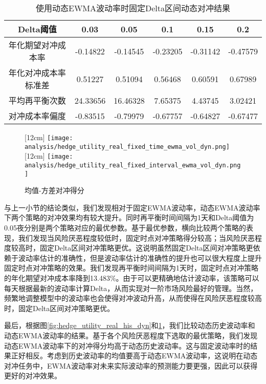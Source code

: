 \begin{table}[htbp]
  \centering
  \caption{使用动态EWMA波动率时固定Delta区间动态对冲结果}
  \label{tab:fixed_interval_5_ewma_vol_dyn}
  \begin{tabular}{cccccc}
    \toprule
    Delta阈值 & 0.03 & 0.05 & 0.1 & 0.15 & 0.2 \\
    \midrule
    年化期望对冲成本率 & -0.14822 & -0.14545 & -0.23205 & -0.31142 & -0.47579 \\
    年化对冲成本率标准差 & 0.51227 & 0.51094 & 0.56468 & 0.60591 & 0.67989 \\
    平均再平衡次数 & 24.33656 & 16.46328 & 7.65375 & 4.43745 & 3.02421 \\
    对冲成本率偏度 & -0.83515 & -0.79979 & -0.67757 & -0.64827 & -0.67477 \\
    \bottomrule
  \end{tabular}
\end{table}

\begin{figure}[htb]
  \centering
  [12cm]
    {\texttt{[image: analysis/hedge\_utility\_real\_fixed\_time\_ewma\_vol\_dyn.png]}}
  \hspace{0.5cm}
  [12cm]
    {\texttt{[image: analysis/hedge\_utility\_real\_fixed\_interval\_ewma\_vol\_dyn.png]}}
    \caption[这里将出现在插图索引中]
    {均值-方差对冲得分}
  \label{fig:hedge_utility_real_ewma_dyn}
\end{figure}

与上一小节的结论类似，我们发现相对于固定EWMA波动率，动态EWMA波动率下两个策略的对冲效果均有较大提升。同时再平衡时间间隔为1天和Delta阈值为0.05夜分别是两个策略对应的最优参数。基于最优参数，横向比较两个策略的表现，我们发现当风险厌恶程度较低时，固定时点对冲策略得分较高；当风险厌恶程度较高时，固定Delta区间对冲策略更优。这说明虽然固定Delta区间对冲策略更依赖于波动率估计的准确性，但是波动率估计的准确性的提升也可以很大程度上提升固定时点对冲策略的效果。我们发现再平衡时间间隔为1天时，固定时点对冲策略的年化期望对冲成本率降到13.483\%。由于可以更精确地估计波动率，该策略可以每天根据最新的波动率计算Delta，从而实现对一阶市场风险最好的管理。当然，频繁地调整模型中的波动率也会使得对冲波动升高，从而使得在风险厌恶程度较高时，固定Delta区间对冲策略更优。

最后，根据图\ref{fig:hedge_utility_real_his_dyn}和\ref{fig:hedge_utility_real_ewma_dyn}，我们比较动态历史波动率和动态EWMA波动率的结果。基于各个风险厌恶程度下选取的最优策略，我们发现动态EWMA波动率下的对冲得分均高于动态历史波动率。这与固定波动率时的结果正好相反。考虑到历史波动率的均值要高于动态EWMA波动率，这说明在动态对冲任务中，EWMA波动率对未来实际波动率的预测能力要更强，因此可以获得更好的对冲效果。

